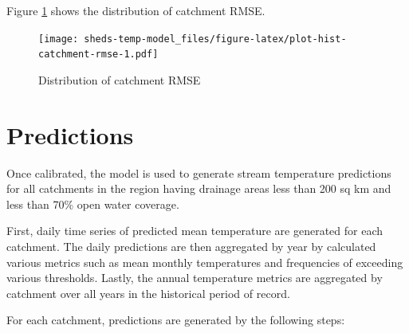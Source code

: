 \documentclass[
]{book}
\begin{document}
Figure \ref{fig:plot-hist-catchment-rmse} shows the distribution of catchment RMSE.

\begin{figure}
\centering
\texttt{[image: sheds-temp-model\_files/figure-latex/plot-hist-catchment-rmse-1.pdf]}
\caption{\label{fig:plot-hist-catchment-rmse}Distribution of catchment RMSE}
\end{figure}

\chapter{Predictions}\label{predictions}

Once calibrated, the model is used to generate stream temperature predictions for all catchments in the region having drainage areas less than 200 sq km and less than 70\% open water coverage.

First, daily time series of predicted mean temperature are generated for each catchment. The daily predictions are then aggregated by year by calculated various metrics such as mean monthly temperatures and frequencies of exceeding various thresholds. Lastly, the annual temperature metrics are aggregated by catchment over all years in the historical period of record.

For each catchment, predictions are generated by the following steps:
\end{document}
